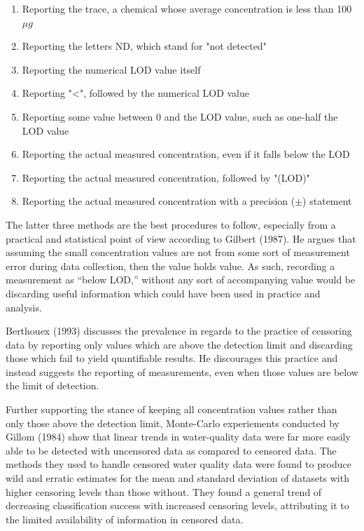 \documentclass[
]{article}
\begin{document}
\begin{enumerate}
  \item Reporting the trace, a chemical whose average concentration is less than 100 $\mu g$
  \item Reporting  the letters ND, which stand for "not detected"
  \item Reporting the numerical LOD value itself
  \item Reporting "<", followed by the numerical LOD value
  \item Reporting some value between 0 and the LOD value, such as one-half the LOD value
  \item Reporting the actual measured concentration, even if it falls below the LOD
  \item Reporting the actual measured concentration, followed by "(LOD)"
  \item Reporting the actual measured concentration with a precision ($\pm$) statement
\end{enumerate}

The latter three methods are the best procedures to follow, especially
from a practical and statistical point of view according to Gilbert
(1987). He argues that assuming the small concentration values are not
from some sort of measurement error during data collection, then the
value holds value. As such, recording a measurement as ``below LOD,''
without any sort of accompanying value would be discarding useful
information which could have been used in practice and analysis.

Berthouex (1993) discusses the prevalence in regards to the practice of
censoring data by reporting only values which are above the detection
limit and discarding those which fail to yield quantifiable results. He
discourages this practice and instead suggests the reporting of
measurements, even when those values are below the limit of detection.

Further supporting the stance of keeping all concentration values rather
than only those above the detection limit, Monte-Carlo experiements
conducted by Gillom (1984) show that linear trends in water-quality data
were far more easily able to be detected with uncensored data as
compared to censored data. The methods they used to handle censored
water quality data were found to produce wild and erratic estimates for
the mean and standard deviation of datasets with higher censoring levels
than those without. They found a general trend of decreasing
classification success with increased censoring levels, attributing it
to the limited availability of information in censored data.
\end{document}
